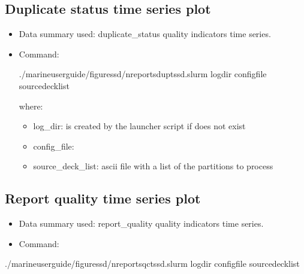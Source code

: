 \documentclass[letterpaper,10pt,english]{sphinxmanual}
\begin{document}
\subsection{Duplicate status time series plot}
\label{\detokenize{index:id6}}\begin{itemize}
\item {} 
Data summary used: duplicate\_status quality indicators time series.

\item {} 
Command:

\begin{sphinxVerbatim}[commandchars=\\\{\}]
./marine\PYGZhy{}user\PYGZhy{}guide/figures\PYGZus{}sd/nreports\PYGZus{}dup\PYGZus{}ts\PYGZus{}sd.slurm log\PYGZus{}dir config\PYGZus{}file source\PYGZus{}deck\PYGZus{}list
\end{sphinxVerbatim}

where:
\begin{itemize}
\item {} 
log\_dir: is created by the launcher script if does not exist

\item {} 
config\_file: {\hyperref[\detokenize{index:nreports-dup-ts-sd}]{}}

\item {} 
source\_deck\_list: ascii file with a list of the  partitions to process

\end{itemize}

\end{itemize}


\subsection{Report quality time series plot}
\label{\detokenize{index:id7}}\begin{itemize}
\item {} 
Data summary used: report\_quality quality indicators time series.

\item {} 
Command:

\end{itemize}

\begin{sphinxVerbatim}[commandchars=\\\{\}]
./marine\PYGZhy{}user\PYGZhy{}guide/figures\PYGZus{}sd/nreports\PYGZus{}qc\PYGZus{}ts\PYGZus{}sd.slurm log\PYGZus{}dir config\PYGZus{}file source\PYGZus{}deck\PYGZus{}list
\end{sphinxVerbatim}
\end{document}

